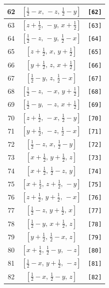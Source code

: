 \documentclass[fleqn,8pt]{jsarticle}
\begin{document}
\begin{longtable}{ccc}
62 & $\left[ \frac{1}{2} - x,\, - z,\, \frac{1}{2} - y \right]$ & {\tt [62]} \\ \hline
63 & $\left[ z + \frac{1}{2},\, - y,\, x + \frac{1}{2} \right]$ & {\tt [63]} \\ \hline
64 & $\left[ \frac{1}{2} - z,\, - y,\, \frac{1}{2} - x \right]$ & {\tt [64]} \\ \hline
65 & $\left[ z + \frac{1}{2},\, x,\, y + \frac{1}{2} \right]$ & {\tt [65]} \\ \hline
66 & $\left[ y + \frac{1}{2},\, z,\, x + \frac{1}{2} \right]$ & {\tt [66]} \\ \hline
67 & $\left[ \frac{1}{2} - y,\, z,\, \frac{1}{2} - x \right]$ & {\tt [67]} \\ \hline
68 & $\left[ \frac{1}{2} - z,\, - x,\, y + \frac{1}{2} \right]$ & {\tt [68]} \\ \hline
69 & $\left[ \frac{1}{2} - y,\, - z,\, x + \frac{1}{2} \right]$ & {\tt [69]} \\ \hline
70 & $\left[ z + \frac{1}{2},\, - x,\, \frac{1}{2} - y \right]$ & {\tt [70]} \\ \hline
71 & $\left[ y + \frac{1}{2},\, - z,\, \frac{1}{2} - x \right]$ & {\tt [71]} \\ \hline
72 & $\left[ \frac{1}{2} - z,\, x,\, \frac{1}{2} - y \right]$ & {\tt [72]} \\ \hline
73 & $\left[ x + \frac{1}{2},\, y + \frac{1}{2},\, z \right]$ & {\tt [73]} \\ \hline
74 & $\left[ x + \frac{1}{2},\, \frac{1}{2} - z,\, y \right]$ & {\tt [74]} \\ \hline
75 & $\left[ x + \frac{1}{2},\, z + \frac{1}{2},\, - y \right]$ & {\tt [75]} \\ \hline
76 & $\left[ z + \frac{1}{2},\, y + \frac{1}{2},\, - x \right]$ & {\tt [76]} \\ \hline
77 & $\left[ \frac{1}{2} - z,\, y + \frac{1}{2},\, x \right]$ & {\tt [77]} \\ \hline
78 & $\left[ \frac{1}{2} - y,\, x + \frac{1}{2},\, z \right]$ & {\tt [78]} \\ \hline
79 & $\left[ y + \frac{1}{2},\, \frac{1}{2} - x,\, z \right]$ & {\tt [79]} \\ \hline
80 & $\left[ x + \frac{1}{2},\, \frac{1}{2} - y,\, - z \right]$ & {\tt [80]} \\ \hline
81 & $\left[ \frac{1}{2} - x,\, y + \frac{1}{2},\, - z \right]$ & {\tt [81]} \\ \hline
82 & $\left[ \frac{1}{2} - x,\, \frac{1}{2} - y,\, z \right]$ & {\tt [82]} \\ \hline

\end{longtable}
\end{document}
